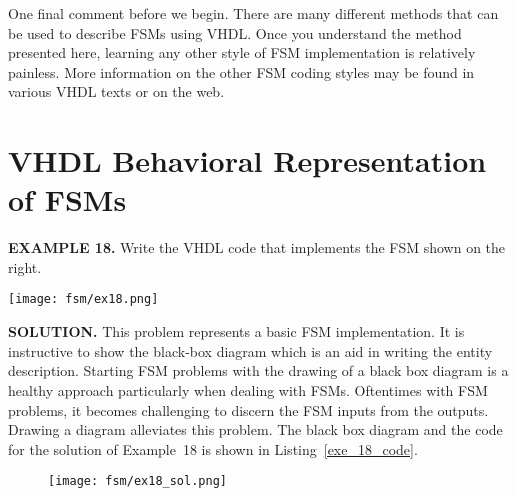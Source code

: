 One final comment before we begin. There are many different methods that can be used to describe FSMs using VHDL. Once you understand the method presented here, learning any other style of FSM implementation is relatively painless. More information on the other FSM coding styles may be found in various VHDL texts or on the web.

\section{VHDL Behavioral Representation of FSMs}

\begin{leftbar}
\begin{minipage}[t]{0.5\textwidth}
\vspace{10pt}
\noindent
\textbf{EXAMPLE 18.}
Write the VHDL code that implements the FSM shown on the right.
\end{minipage}
\begin{minipage}[t]{0.47\textwidth}
\vspace{0pt}\raggedright
    \centering
	\texttt{[image: fsm/ex18.png]}
\end{minipage}
\end{leftbar}
\noindent
\textbf{SOLUTION.} This problem represents a basic FSM implementation. It is instructive to show the black-box diagram which is an aid in writing the entity description. Starting FSM problems with the drawing of a black box diagram is a healthy approach particularly when dealing with FSMs. Oftentimes with FSM problems, it becomes challenging to discern the FSM inputs from the outputs. Drawing a diagram alleviates this problem. The black box diagram and the code for the solution of Example~18 is shown in Listing~\ref{exe_18_code}.

\begin{figure}[!h]
    \centering
	\texttt{[image: fsm/ex18\_sol.png]}
\end{figure}

